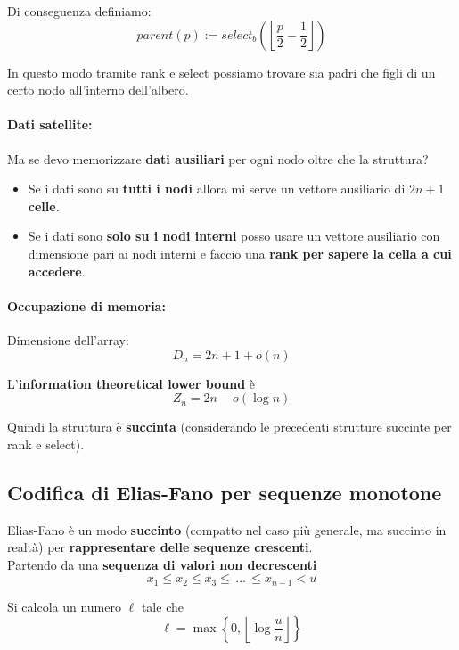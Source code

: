 Di conseguenza definiamo:
$$ parent(p) := select_b \left(\left\lfloor \frac{p}{2} - \frac{1}{2} \right\rfloor\right) $$

In questo modo tramite rank e select possiamo trovare sia padri che figli di un certo nodo all'interno dell'albero.\\

\paragraph{Dati satellite:} Ma se devo memorizzare \textbf{dati ausiliari} per ogni nodo oltre che la struttura?
\begin{itemize}
	\item Se i dati sono su \textbf{tutti i nodi} allora mi serve un vettore ausiliario di $2n+1$ \textbf{celle}.\\
	
	\item Se i dati sono \textbf{solo su i nodi interni} posso usare un vettore ausiliario con dimensione pari ai nodi interni e faccio una \textbf{rank per sapere la cella a cui accedere}.\\
\end{itemize}

\paragraph{Occupazione di memoria:} Dimensione dell'array: 
$$D_n = 2n + 1 + o(n)$$

L'\textbf{information theoretical lower bound} è 
$$ Z_n = 2n - o (\log n)$$

Quindi la struttura è \textbf{succinta} (considerando le precedenti strutture succinte per rank e select).\\

\newpage

\subsection{Codifica di Elias-Fano per sequenze monotone}
Elias-Fano è un modo \textbf{succinto} (compatto nel caso più generale, ma succinto in realtà) per \textbf{rappresentare delle sequenze crescenti}.\\

Partendo da una \textbf{sequenza di valori non decrescenti}
$$ x_1 \leq x_2 \leq x_3 \leq \, \dots \, \leq x_{n-1} < u $$

Si calcola un numero $\ell$ tale che
$$ \ell = \max \left\{0, \left\lfloor \log \frac{u}{n} \right\rfloor\right\} $$

